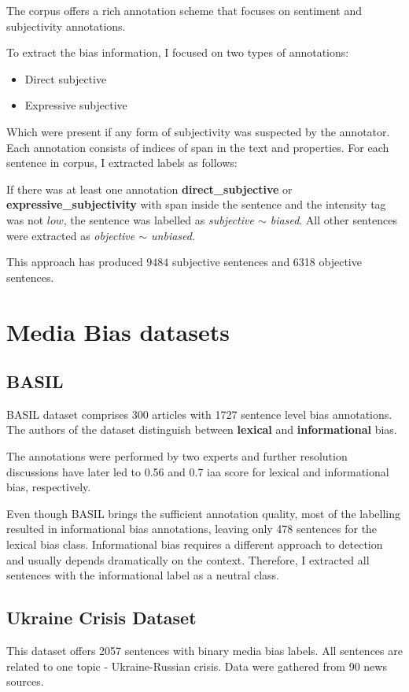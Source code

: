 The corpus offers a rich annotation scheme \cite{wiebe2005annotating} that focuses on sentiment and subjectivity annotations.

To extract the bias information, I focused on two types of annotations:
\begin{itemize}
    \item Direct subjective
    \item Expressive subjective
\end{itemize}
Which were present if any form of subjectivity was suspected by the annotator. Each annotation consists of indices of span in the text and properties. For each sentence in corpus, I extracted labels as follows:

If there was at least one annotation \textbf{direct\_subjective} or \textbf{expressive\_subjectivity} with span inside the sentence and the intensity tag was not $low$, the sentence was labelled as \textit{subjective $\sim$ biased}. All other sentences were extracted as \textit{objective $\sim$ unbiased}.

This approach has produced $9484$ subjective sentences and 6318 objective sentences.


\section{Media Bias datasets}


\subsection{BASIL}
BASIL dataset \cite{fan2019plain} comprises 300 articles with 1727 sentence level bias annotations. The authors of the dataset distinguish between \textbf{lexical} and \textbf{informational} bias.

The annotations were performed by two experts and further resolution discussions have later led to 0.56 and 0.7 \Gls{iaa} score for lexical and informational bias, respectively.

Even though BASIL brings the sufficient annotation quality, most of the labelling resulted in informational bias annotations, leaving only 478 sentences for the lexical bias class. Informational bias requires a different approach to detection \cite{van2020context} and usually depends dramatically on the context. Therefore, I extracted all sentences with the informational label as a neutral class.




\subsection{Ukraine Crisis Dataset}
This dataset \cite{farber2020multidimensional} offers 2057 sentences with binary media bias labels. All sentences are related to one topic - Ukraine-Russian crisis. Data were gathered from 90 news sources.

